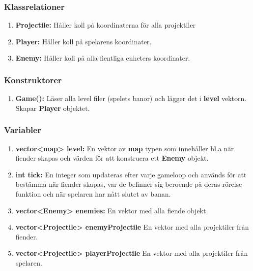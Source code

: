 \documentclass{TDP005mall}
\begin{document}
\subsubsection*{Klassrelationer}
\begin{enumerate}
  \item \textbf{Projectile: } Håller koll på koordinaterna för alla projektiler
  \item \textbf{Player: } Håller koll på spelarens koordinater.
  \item \textbf{Enemy: } Håller koll på alla fientliga enheters koordinater.
 \end{enumerate}
 \subsubsection*{Konstruktorer}
 \begin{enumerate}
   \item \textbf{Game():} Läser alla level filer (spelets banor) och lägger det i \textbf{level} vektorn. 
                          Skapar \textbf{Player} objektet.
 \end{enumerate}
 \subsubsection*{Variabler}
 \begin{enumerate}
   \item \textbf{vector<map> level:} En vektor av \textbf{map} typen som innehåller bl.a när fiender skapas och värden för att konstruera ett \textbf{Enemy} objekt.
   \item \textbf{int tick:} En integer som updateras efter varje gameloop och används för att bestämma när fiender skapas, var de befinner sig beroende på deras rörelse funktion och när spelaren har nått slutet av banan.
    \item \textbf{vector<Enemy> enemies: } En vektor med alla fiende objekt.
    \item \textbf{vector<Projectile> enemyProjectile} En vektor med alla projektiler från fiender.
    \item \textbf{vector<Projectile> playerProjectile} En vektor med alla projektiler från spelaren.
 \end{enumerate}
\end{document}
